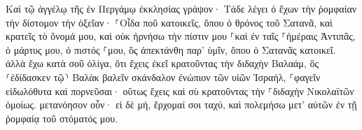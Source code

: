 \documentclass{openreader}
\begin{document}
Καὶ τῷ ἀγγέλῳ τῆς ἐν Περγάμῳ ἐκκλησίας γράψον· Τάδε λέγει ὁ ἔχων τὴν ῥομφαίαν τὴν δίστομον τὴν ὀξεῖαν· 
⸀Οἶδα ποῦ κατοικεῖς, ὅπου ὁ θρόνος τοῦ Σατανᾶ, καὶ κρατεῖς τὸ ὄνομά μου, καὶ οὐκ ἠρνήσω τὴν πίστιν μου ⸀καὶ ἐν ταῖς ⸀ἡμέραις Ἀντιπᾶς, ὁ μάρτυς μου, ὁ πιστός ⸀μου, ὃς ἀπεκτάνθη παρ’ ὑμῖν, ὅπου ὁ Σατανᾶς κατοικεῖ. 
ἀλλὰ ἔχω κατὰ σοῦ ὀλίγα, ὅτι ἔχεις ἐκεῖ κρατοῦντας τὴν διδαχὴν Βαλαάμ, ὃς ⸂ἐδίδασκεν τῷ⸃ Βαλὰκ βαλεῖν σκάνδαλον ἐνώπιον τῶν υἱῶν Ἰσραήλ, ⸀φαγεῖν εἰδωλόθυτα καὶ πορνεῦσαι· 
οὕτως ἔχεις καὶ σὺ κρατοῦντας τὴν ⸀διδαχὴν Νικολαϊτῶν ὁμοίως. 
μετανόησον οὖν· εἰ δὲ μή, ἔρχομαί σοι ταχύ, καὶ πολεμήσω μετ’ αὐτῶν ἐν τῇ ῥομφαίᾳ τοῦ στόματός μου. 
\end{document}
